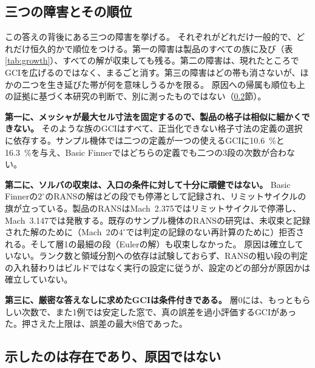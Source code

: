 \documentclass[twocolumn]{labreport}
\begin{document}
\subsection{三つの障害とその順位}
\label{sec:causes}

この答えの背後にある三つの障害を挙げる。
それぞれがどれだけ一般的で、どれだけ恒久的かで順位をつける。第一の障害は製品のすべての族に及び（表\ref{tab:growth}）、すべての解が収束しても残る。第二の障害は、現れたところでGCIを広げるのではなく、まるごと消す。第三の障害はどの帯も消さないが、ほかの二つを生き延びた帯が何を意味しうるかを限る。
原因への帰属も順位も上の証拠に基づく本研究の判断で、別に測ったものではない（\ref{sec:existence}節）。

\textbf{第一に、メッシャが最大セル寸法を固定するので、製品の格子は相似に細かくできない。}
そのような族のGCIはすべて、正当化できない格子寸法の定義の選択に依存する。サンプル機体では二つの定義が一つの使えるGCIに10.6~\%と16.3~\%を与え、Basic Finnerではどちらの定義でも二つの3段の次数が合わない。

\textbf{第二に、ソルバの収束は、入口の条件に対して十分に頑健ではない。}
Basic Finnerの$2^\circ$のRANSの解はどの段でも停滞として記録され、リミットサイクルの旗が立っている。製品のRANSはMach~2.375ではリミットサイクルで停滞し、Mach~3.147では発散する。既存のサンプル機体のRANSの研究は、未収束と記録された解のために（Mach~2の$4^\circ$では判定の記録のない再計算のために）拒否される。そして層1の最細の段（Eulerの解）も収束しなかった。
原因は確立していない。ランク数と領域分割への依存は試験しておらず、RANSの粗い段の判定の入れ替わりはビルドではなく実行の設定に従うが、設定のどの部分が原因かは確立していない。

\textbf{第三に、厳密な答えなしに求めたGCIは条件付きである。}
層0には、もっともらしい次数で、また1例では安定した窓で、真の誤差を過小評価するGCIがあった。押さえた上限は、誤差の最大8倍であった。

\subsection{示したのは存在であり、原因ではない}
\label{sec:existence}
\end{document}
